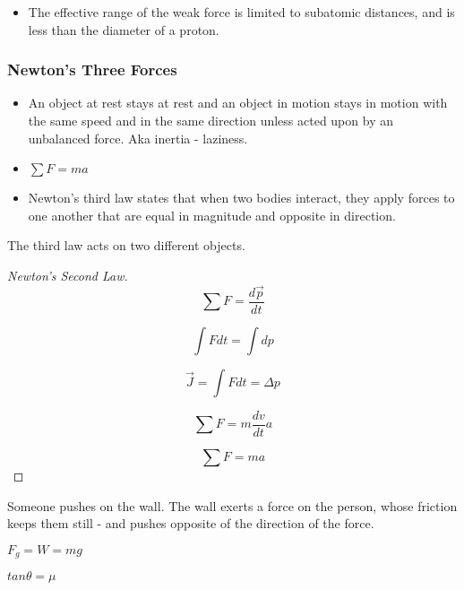 \documentclass{scrreprt} %
\begin{document}
\begin{itemize}
	\item The effective range of the weak force is limited to subatomic
	distances, and is less than the diameter of a proton.
\end{itemize}

\subsubsection{Newton's Three Forces}

\begin{itemize}
	\item An object at rest stays at rest and an object in motion stays in
	motion with the same speed and in the same direction unless acted upon by an
	unbalanced force. Aka inertia - laziness.
	\item $\sum F = ma$
	\item Newton’s third law states that when two bodies interact, they apply
	forces to one another that are equal in magnitude and opposite in direction.
\end{itemize}

\begin{remark}
	The third law acts on two different objects.
\end{remark}

\begin{proof}[Newton's Second Law]
	
$$\sum F = \frac{d\vec{p}}{dt}$$

$$\int F dt = \int dp $$

$$\vec{J} = \int F dt = \Delta p$$

$$\sum F = m\frac{dv}{dt}a$$

$$\sum F = ma$$

\end{proof}


\begin{example}
Someone pushes on the wall. The wall exerts a force on the person, whose
friction keeps them still -  and pushes opposite of the direction of the
force.
\end{example}

$F_g = W = mg$

\begin{theorem}
	$tan\theta = \mu$
\end{theorem}
\end{document}
